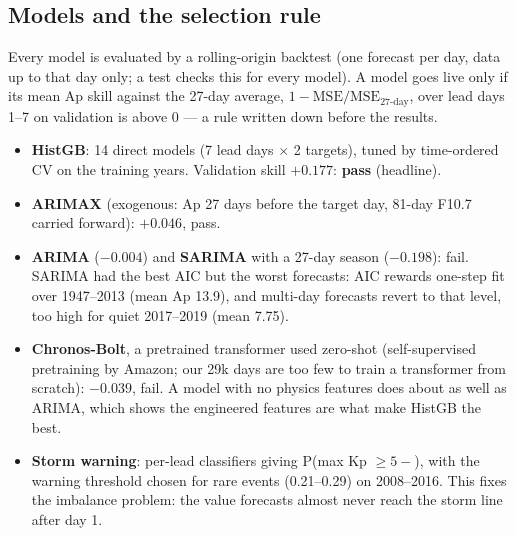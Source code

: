 \documentclass[11pt,a4paper]{article}
\begin{document}
\subsection{Models and the selection rule}
Every model is evaluated by a rolling-origin backtest (one forecast per day, data up to that day only; a test
checks this for every model). A model goes live only if its mean Ap skill against the 27-day average,
$1-\mathrm{MSE}/\mathrm{MSE}_{\text{27-day}}$, over lead days 1--7 on validation is above 0 --- a rule written down
before the results.
\begin{itemize}[leftmargin=*]
\item \textbf{HistGB}: 14 direct models (7 lead days $\times$ 2 targets), tuned by time-ordered CV on the training
years. Validation skill $+0.177$: \textbf{pass} (headline).
\item \textbf{ARIMAX} (exogenous: Ap 27 days before the target day, 81-day F10.7 carried forward): $+0.046$, pass.
\item \textbf{ARIMA} ($-0.004$) and \textbf{SARIMA} with a 27-day season ($-0.198$): fail. SARIMA had the best AIC
but the worst forecasts: AIC rewards one-step fit over 1947--2013 (mean Ap 13.9), and multi-day forecasts revert to
that level, too high for quiet 2017--2019 (mean 7.75).
\item \textbf{Chronos-Bolt}, a pretrained transformer used zero-shot (self-supervised pretraining by Amazon; our
29k days are too few to train a transformer from scratch): $-0.039$, fail. A model with no physics features does
about as well as ARIMA, which shows the engineered features are what make HistGB the best.
\item \textbf{Storm warning}: per-lead classifiers giving P(max Kp $\ge 5-$), with the warning threshold chosen for
rare events (0.21--0.29) on 2008--2016. This fixes the imbalance problem: the value forecasts almost never reach
the storm line after day 1.
\end{itemize}
\end{document}
